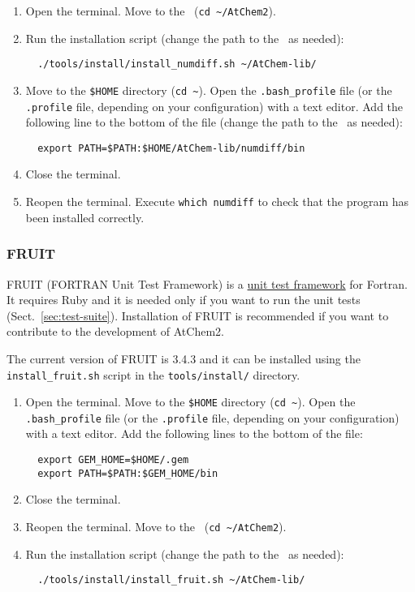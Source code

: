\begin{enumerate}
\item Open the terminal. Move to the \maindir\ (\verb|cd ~/AtChem2|).
\item Run the installation script (change the path to the \depdir\ as
  needed):
  \begin{verbatim}
  ./tools/install/install_numdiff.sh ~/AtChem-lib/
  \end{verbatim}
\item Move to the \texttt{\$HOME} directory (\texttt{cd\ \textasciitilde}).
  Open the \texttt{.bash\_profile} file (or the \texttt{.profile}
  file, depending on your configuration) with a text editor. Add the
  following line to the bottom of the file (change the path to the
  \depdir\ as needed):
  \begin{verbatim}
  export PATH=$PATH:$HOME/AtChem-lib/numdiff/bin
  \end{verbatim}
\item Close the terminal.
\item Reopen the terminal. Execute \verb|which numdiff| to check that
  the program has been installed correctly.
\end{enumerate}

\subsubsection{FRUIT}

FRUIT (FORTRAN Unit Test Framework) is a
\href{https://en.wikipedia.org/wiki/Unit_testing}{unit test framework}
for Fortran. It requires Ruby and it is needed only if you want to run
the unit tests (Sect.~\ref{sec:test-suite}). Installation of FRUIT is
recommended if you want to contribute to the development of AtChem2.

The current version of FRUIT is 3.4.3 and it can be installed using
the \texttt{install\_fruit.sh} script in the \texttt{tools/install/}
directory.

\begin{enumerate}
\item Open the terminal. Move to the \texttt{\$HOME} directory
  (\texttt{cd\ \textasciitilde}). Open the \texttt{.bash\_profile}
  file (or the \texttt{.profile} file, depending on your
  configuration) with a text editor. Add the following lines to the
  bottom of the file:
  \begin{verbatim}
  export GEM_HOME=$HOME/.gem
  export PATH=$PATH:$GEM_HOME/bin
  \end{verbatim}
\item Close the terminal.
\item Reopen the terminal. Move to the \maindir\ (\verb|cd ~/AtChem2|).
\item Run the installation script (change the path to the \depdir\ as
  needed):
  \begin{verbatim}
  ./tools/install/install_fruit.sh ~/AtChem-lib/
  \end{verbatim}
\end{enumerate}

